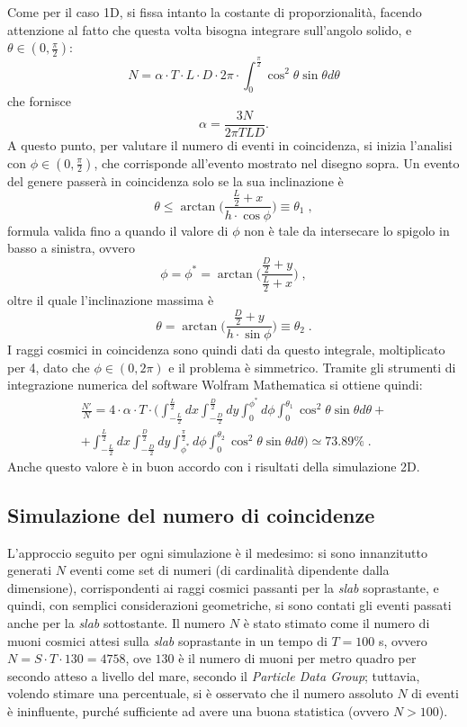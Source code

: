 Come per il caso 1D, si fissa intanto la costante di proporzionalità, facendo attenzione al fatto che questa volta bisogna integrare sull'angolo solido, e $\theta\in(0,\frac{\pi}{2})$: 
$$N = \alpha \cdot T \cdot L \cdot D \cdot 2\pi \cdot \int_{0}^{\frac{\pi}{2}} \cos^2\theta  \sin\theta d\theta$$
che fornisce 
$$\alpha = \frac{3N}{2\pi TLD}.$$ 
A questo punto, per valutare il numero di eventi in coincidenza, si inizia l'analisi con $\phi\in(0, \frac{\pi}{2})$, che corrisponde all'evento mostrato nel disegno sopra. Un evento del genere passerà in coincidenza solo se la sua inclinazione è $$\theta \leq \arctan \bigg(\frac{\frac{L}{2}+x}{h\cdot \cos\phi}\bigg) \equiv \theta_1\;,$$ formula valida fino a quando il valore di $\phi$ non è tale da intersecare lo spigolo in basso a sinistra, ovvero $$\phi = \phi^{*} = \arctan \bigg(\frac{\frac{D}{2}+y}{\frac{L}{2}+x}\bigg)\;,$$ oltre il quale l'inclinazione massima è $$\theta = \arctan \bigg(\frac{\frac{D}{2}+y}{h\cdot \sin\phi}\bigg)  \equiv \theta_2\;.$$I raggi cosmici in coincidenza sono quindi dati da questo integrale, moltiplicato per 4, dato che $\phi\in(0, 2\pi)$ e il problema è simmetrico. Tramite gli strumenti di integrazione numerica del software Wolfram Mathematica si ottiene quindi:
\begin{multline*}
\frac{N'}{N}=4\cdot \alpha \cdot T\cdot \bigg( \int_{-\frac{L}{2}}^{\frac{L}{2}} dx \int_{-\frac{D}{2}}^{\frac{D}{2}} dy \int_0^{\phi^{*}} d\phi \int_0^{\theta_1} \cos^2\theta \sin\theta d\theta +\\
+ \int_{-\frac{L}{2}}^{\frac{L}{2}} dx \int_{-\frac{D}{2}}^{\frac{D}{2}} dy \int_{\phi^{*}}^{\frac{\pi}{2}} d\phi \int_0^{\theta_2} \cos^2\theta \sin\theta d\theta\bigg)\simeq 73.89 \%\;.
\end{multline*} 
Anche questo valore è in buon accordo con i risultati della simulazione 2D.

\subsection{Simulazione del numero di coincidenze}
L'approccio seguito per ogni simulazione è il medesimo: si sono innanzitutto generati $N$ eventi come set di numeri (di cardinalità dipendente dalla dimensione), corrispondenti ai raggi cosmici passanti per la \emph{slab} soprastante, e quindi, con semplici considerazioni geometriche, si sono contati gli eventi passati anche per la \emph{slab} sottostante. Il numero $N$ è stato stimato come il numero di muoni cosmici attesi sulla \emph{slab} soprastante in un tempo di $T=100$ s, ovvero $N=S\cdot T\cdot 130=4758$, ove $130$ è il numero di muoni per metro quadro per secondo atteso a livello del mare, secondo il \emph{Particle Data Group}; tuttavia, volendo stimare una percentuale, si è osservato che il numero assoluto $N$ di eventi è ininfluente, purché sufficiente ad avere una buona statistica (ovvero $N>100$).


